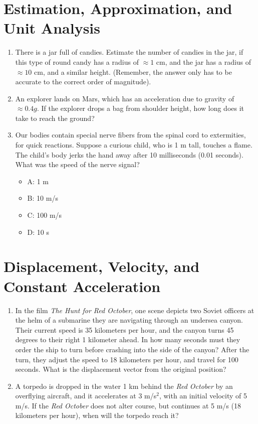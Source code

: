 \documentclass[10pt]{article}
\begin{document}
\maketitle

\section{Estimation, Approximation, and Unit Analysis}
\begin{enumerate}
\item There is a jar full of candies.  Estimate the number of candies in the jar, if this type of round candy has a radius of $\approx 1$ cm, and the jar has a radius of $\approx 10$ cm, and a similar height.  (Remember, the answer only has to be accurate to the correct order of magnitude). \vspace{1.5 cm}
\item An explorer lands on Mars, which has an acceleration due to gravity of $\approx 0.4 g$.  If the explorer drops a bag from shoulder height, how long does it take to reach the ground? \vspace{1.5 cm}
\item Our bodies contain special nerve fibers from the spinal cord to extermities, for quick reactions.  Suppose a curious child, who is 1 m tall, touches a flame.  The child's body jerks the hand away after 10 milliseconds (0.01 seconds).  What was the speed of the nerve signal? \\
\begin{itemize}
\item A: 1 m
\item B: 10 m/s
\item C: 100 m/s
\item D: 10 s
\end{itemize}
\end{enumerate}
\section{Displacement, Velocity, and Constant Acceleration}
\begin{enumerate}
\item In the film \textit{The Hunt for Red October}, one scene depicts two Soviet officers at the helm of a submarine they are navigating through an undersea canyon.  Their current speed is 35 kilometers per hour, and the canyon turns 45 degrees to their right 1 kilometer ahead.  In how many seconds must they order the ship to turn before crashing into the side of the canyon?  After the turn, they adjust the speed to 18 kilometers per hour, and travel for 100 seconds.  What is the displacement vector from the original position?\vspace{3cm}
\item A torpedo is dropped in the water 1 km behind the \textit{Red October} by an overflying aircraft, and it accelerates at 3 m/s$^2$, with an initial velocity of 5 m/s.  If the \textit{Red October} does not alter course, but continues at 5 m/s (18 kilometers per hour), when will the torpedo reach it?\vspace{3cm}
\end{enumerate}
\end{document}

